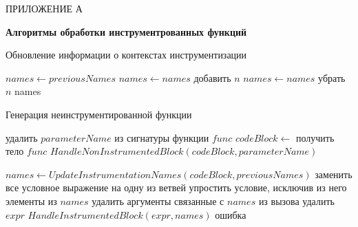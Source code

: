 \hfill ПРИЛОЖЕНИЕ А
\begin{center}
  \textbf{Алгоритмы обработки инструментрованных функций}
\end{center}
\markboth{\MakeUppercase{}}{}

\begin{algorithm}
\caption{Обновление информации о контекстах инструментизации}\label{alg:names}
\begin{algorithmic}[1]
  \State $names \gets previousNames$
      \State $names \gets names$ добавить $n$
      \State $names \gets names$ убрать $n$
    \EndIf
  \EndFor
  \State \Return names
\EndFunction
\end{algorithmic}
\end{algorithm}

\begin{algorithm}
\caption{Генерация неинструментированной функции}\label{alg:nonins}
\begin{algorithmic}[1]
  \State удалить $parameterName$ из сигнатуры функции $func$
  \State $codeBlock \gets$ получить тело $func$
  \State $HandleNonInstrumentedBlock(codeBlock, parameterName)$
\EndFunction

  \State $names \gets UpdateInstrumentationNames(codeBlock, previousNames)$
      \State заменить все условное выражение на одну из ветвей
      \State упростить условие, исключив из него элементы из $names$
      \State удалить аргументы связанные с $names$ из вызова
      \State удалить $expr$
      \State $HandleInstrumentedBlock(expr, names)$
      \State \Return ошибка
    \EndIf
  \EndFor
\EndFunction
\end{algorithmic}
\end{algorithm}

